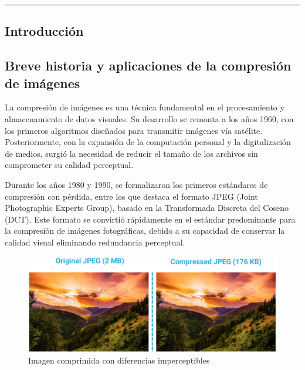 \documentclass[8pt,a4paper]{article}
\theoremstyle{definition}
\theoremstyle{remark}
\begin{document}
	\begin{center}
		\textcolor{azul}{\rule{150mm}{0.5mm}}
	\end{center}		

	\vspace{5mm}


	\begin{multicols}{2}
	\begin{center}
    \section{Introducción}
    \end{center}

        \subsection{Breve historia y aplicaciones de la compresión de imágenes}
        
            La compresión de imágenes es una técnica fundamental en el procesamiento y almacenamiento de datos visuales. Su desarrollo se remonta a los años 1960, con los primeros algoritmos diseñados para transmitir imágenes vía satélite. Posteriormente, con la expansión de la computación personal y la digitalización de medios, surgió la necesidad de reducir el tamaño de los archivos sin comprometer su calidad perceptual.
            
            Durante los años 1980 y 1990, se formalizaron los primeros estándares de compresión con pérdida, entre los que destaca el formato JPEG (Joint Photographic Experts Group), basado en la Transformada Discreta del Coseno (DCT). Este formato se convirtió rápidamente en el estándar predominante para la compresión de imágenes fotográficas, debido a su capacidad de conservar la calidad visual eliminando redundancia perceptual.
    \begin{figure}[H]
                \centering
                \includegraphics[width=0.8\linewidth]{compression.jpg}
                \captionsetup{skip=2pt}
                \caption*{Imagen comprimida con diferencias imperceptibles}
            \end{figure}

\end{multicols}
\end{document}
